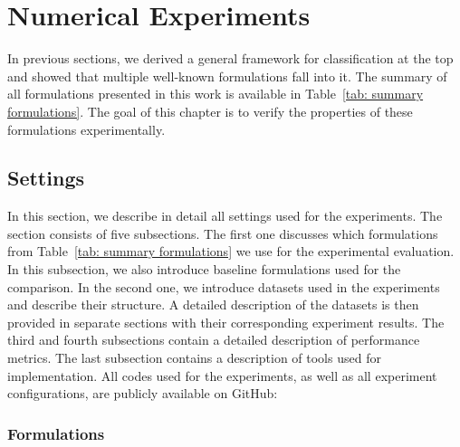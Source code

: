 \chapter{Numerical Experiments}\label{chap: experiments}

In previous sections, we derived a general framework for classification at the top and showed that multiple well-known formulations fall into it. The summary of all formulations presented in this work is available in Table~\ref{tab: summary formulations}. The goal of this chapter is to verify the properties of these formulations experimentally.

\section{Settings}\label{sec: settings}

In this section, we describe in detail all settings used for the experiments. The section consists of five subsections. The first one discusses which formulations from Table~\ref{tab: summary formulations} we use for the experimental evaluation. In this subsection, we also introduce baseline formulations used for the comparison. In the second one, we introduce datasets used in the experiments and describe their structure. A detailed description of the datasets is then provided in separate sections with their corresponding experiment results. The third and fourth subsections contain a detailed description of performance metrics. The last subsection contains a description of tools used for implementation. All codes used for the experiments, as well as all experiment configurations, are publicly available on GitHub:
\github

\subsection{Formulations}

